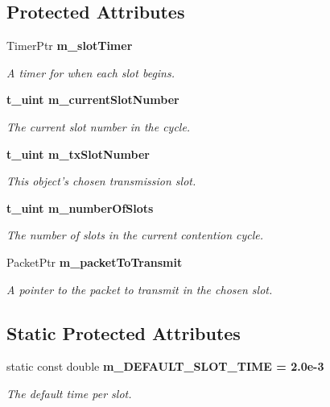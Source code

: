 \subsection*{Protected Attributes}
\begin{CompactItemize}
\item 
Timer\-Ptr \bf{m\_\-slot\-Timer}\label{classSlottedMac_5386c5d39426ac98d2647cbfc44a66e1}

\begin{CompactList}\small\item\em A timer for when each slot begins. \item\end{CompactList}\item 
\bf{t\_\-uint} \bf{m\_\-current\-Slot\-Number}\label{classSlottedMac_91232b9266e0c169131934d50bbf19fc}

\begin{CompactList}\small\item\em The current slot number in the cycle. \item\end{CompactList}\item 
\bf{t\_\-uint} \bf{m\_\-tx\-Slot\-Number}\label{classSlottedMac_cb05cd3a34804495a26f07af82245d41}

\begin{CompactList}\small\item\em This object's chosen transmission slot. \item\end{CompactList}\item 
\bf{t\_\-uint} \bf{m\_\-number\-Of\-Slots}
\begin{CompactList}\small\item\em The number of slots in the current contention cycle. \item\end{CompactList}\item 
Packet\-Ptr \bf{m\_\-packet\-To\-Transmit}\label{classSlottedMac_58354b4d36f7c2ffc2317d90425a29ee}

\begin{CompactList}\small\item\em A pointer to the packet to transmit in the chosen slot. \item\end{CompactList}\end{CompactItemize}
\subsection*{Static Protected Attributes}
\begin{CompactItemize}
\item 
static const double \bf{m\_\-DEFAULT\_\-SLOT\_\-TIME} = 2.0e-3\label{classSlottedMac_116f2f50b04d4e50ea6dc752a48435f3}

\begin{CompactList}\small\item\em The default time per slot. \item\end{CompactList}\end{CompactItemize}
